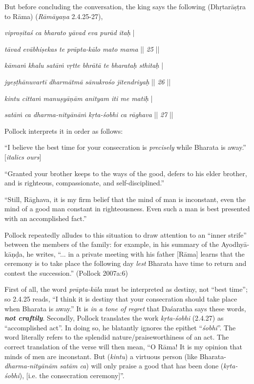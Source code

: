 But before concluding the conversation, the king says the following (Dhṛtarāṣṭra to Rāma) ({\sl Rāmāyaṇa} 2.4.25-27), 

\begin{myquote}
{{\sl viproṣitaś ca bharato yāvad eva purād itaḥ}} |

{{\sl tāvad evābhiṣekas te prāpta-kālo mato mama}} || {\sl 25} ||

{\sl kāmaṁ khalu satāṁ vṛtte bhrātā te bharataḥ sthitaḥ} |

{\sl jyeṣṭhānuvartī dharmātmā sānukrośo jitendriyaḥ} || {\sl 26} ||

{\sl kintu cittaṁ manuṣyāṇām anityam iti me matiḥ} |

{\sl satāṁ ca dharma-nityānāṁ kṛta-śobhi ca rāghava} || {\sl 27} ||
\end{myquote}

Pollock interprets it in order as follows:

\begin{myquote}
“I believe the best time for your consecration is {\sl precisely} while Bharata is away.” [{\sl italics ours}]
								 	 
“Granted your brother keeps to the ways of the good, defers to his elder brother, and is righteous, compassionate, and self-disciplined.”
		 
“Still, Rāghava, it is my firm belief that the mind of man is inconstant, even the mind of a good man constant in righteousness. Even such a man is best presented with an accomplished fact.”	
\end{myquote}

Pollock repeatedly alludes to this situation to draw attention to an “inner strife” between the members of the family: for example, in his summary of the Ayodhyā-kāṇḍa, he writes, “... in a private meeting with his father [Rāma] learns that the ceremony is to take place the following day {\sl lest} Bharata have time to return and contest the succession.” (Pollock 2007a:6)

First of all, the word {\sl prāpta-kāla} must be interpreted as destiny, not “best time”; so 2.4.25 reads, “I think it is destiny that your consecration should take place when Bharata is away.” It is {\sl in a tone of regret} that Daśaratha says these words, {\sl\bfseries not craftily}. Secondly, Pollock translates the work {\sl kṛta-śobhi} (2.4.27) as “accomplished act”. In doing so, he blatantly ignores the epithet “{\sl śobhi}”. The word literally refers to the splendid nature/praiseworthiness of an act. The correct translation of the verse will then mean, “O Rāma! It is my opinion that minds of men are inconstant. But ({\sl kintu}) a virtuous person (like Bharata- {\sl dharma-nityānām satām ca}) will only praise a good that has been done ({\sl kṛta-śobhi}), [i.e. the consecration ceremony]”. 

